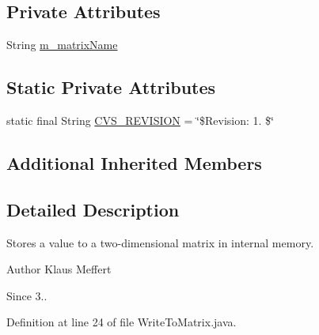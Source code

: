 \subsection*{Private Attributes}
\begin{DoxyCompactItemize}
\item 
String \hyperlink{classorg_1_1jgap_1_1gp_1_1function_1_1_write_to_matrix_a877557b49dc503786a4e440fb4df8991}{m\-\_\-matrix\-Name}
\end{DoxyCompactItemize}
\subsection*{Static Private Attributes}
\begin{DoxyCompactItemize}
\item 
static final String \hyperlink{classorg_1_1jgap_1_1gp_1_1function_1_1_write_to_matrix_a912a5ba16ce8c660a5d0668c740580f1}{C\-V\-S\-\_\-\-R\-E\-V\-I\-S\-I\-O\-N} = \char`\"{}\$Revision\-: 1. \$\char`\"{}
\end{DoxyCompactItemize}
\subsection*{Additional Inherited Members}


\subsection{Detailed Description}
Stores a value to a two-\/dimensional matrix in internal memory.

\begin{DoxyAuthor}{Author}
Klaus Meffert 
\end{DoxyAuthor}
\begin{DoxySince}{Since}
3.. 
\end{DoxySince}


Definition at line 24 of file Write\-To\-Matrix.\-java.



